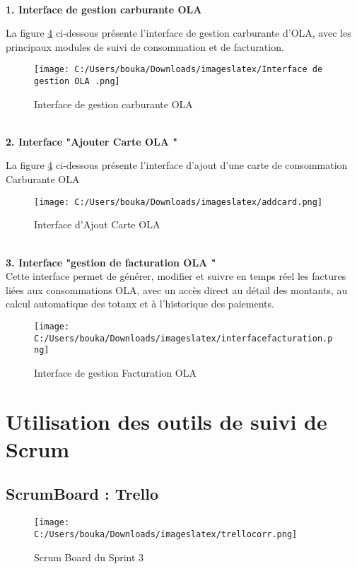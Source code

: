 \documentclass[a4paper,11pt]{report}
\begin{document}
\textbf{      \\ 1. Interface de gestion carburante OLA}

La figure \ref{fig:clone-result} ci-dessous présente l’interface de gestion carburante d’OLA, avec les principaux modules de suivi de consommation et de facturation.

\begin{figure}[H]
  \centering
  \texttt{[image: C:/Users/bouka/Downloads/imageslatex/Interface de gestion OLA .png]}
  \caption{Interface de gestion carburante OLA}
  \label{fig:clone-result}
\end{figure}




\textbf{      \\ 2. Interface  "Ajouter Carte OLA "}

La figure \ref{fig:clone-result} ci-dessous présente l’interface d'ajout d'une carte de consommation Carburante OLA

\begin{figure}[H]
  \centering
  \texttt{[image: C:/Users/bouka/Downloads/imageslatex/addcard.png]}
  \caption{Interface d'Ajout Carte OLA}
  \label{fig:clone-result}
\end{figure}

\textbf{      \\ 3. Interface  "gestion de facturation OLA "}
\\
Cette interface permet de générer, modifier et suivre en temps réel les factures liées aux consommations OLA, avec un accès direct au détail des montants, au calcul automatique des totaux et à l’historique des paiements.
\begin{figure}[H]
  \centering
  \texttt{[image: C:/Users/bouka/Downloads/imageslatex/interfacefacturation.png]}
  \caption{Interface de gestion Facturation OLA}
  \label{fig:clone-result}
\end{figure}











\section{Utilisation des outils de suivi de Scrum}

\subsection{ScrumBoard : Trello}


\begin{figure}[H]
  \centering
  \texttt{[image: C:/Users/bouka/Downloads/imageslatex/trellocorr.png]}
  \caption{Scrum Board du Sprint 3}
  \label{fig:clone-result}
\end{figure}
\end{document}
